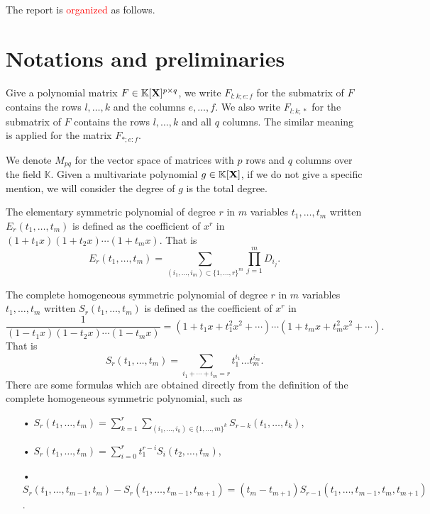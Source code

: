 \documentclass[11pt]{article}
\numberwithin{Property}{section}
\numberwithin{Theorem}{section}
\numberwithin{Proposition}{section}
\numberwithin{Lemma}{section}
\numberwithin{Corollary}{section}
\numberwithin{Definition}{section}
\numberwithin{Remark}{section}
\numberwithin{Conjecture}{section}
\numberwithin{Problem}{section}
\numberwithin{Claim}{section}
\theoremstyle{definition}
\numberwithin{Example}{section}
\newcommand{\field}{\mathbb{K}} %
\newcommand{\mat}[1]{\mathbf{\MakeUppercase{#1}}} %
\newcommand{\todo}[1]{\textcolor{red}{#1}} %
\begin{document}
The report is \todo{organized} as follows.
\section{Notations and preliminaries}
\label{sec:not}
Give a polynomial matrix $F \in \field[\mat{X}]^{p \times q}$, we write $F_{l:k \mathbf{;} e:f}$ for the submatrix of $F$ contains the rows $l, \ldots, k$ and the columns $e, \ldots, f$. We also write $F_{l:k \mathbf{;} *}$ for the submatrix of $F$ contains the rows $l, \ldots, k$ and all $q$ columns. The similar meaning is applied for the matrix $F_{* \mathbf{;} e:f}$. 

We denote $M_{pq}$ for the vector space of matrices with $p$ rows and $q$ columns over the field $\field$. Given a multivariate polynomial $g \in \field[\mat{X}]$, if we do not give a specific mention, we will consider the degree of $g$ is the total degree.  %

The elementary symmetric polynomial of degree $r$ in $m$ variables $t_1, \ldots, t_m$ written $E_{r}(t_1, \ldots, t_m)$ is defined as the coefficient of $x^r$ in $(1+t_1x)(1+t_2x)\cdots(1+t_mx)$. That is
\[E_{r}(t_1, \ldots, t_m) = \sum_{(i_1,\ldots,i_{m}) \subset \{1, \ldots, r\}^{m}}\prod_{j =1}^{m}D_{i_j}.\]

The complete homogeneous symmetric polynomial of degree $r$ in $m$ variables $t_1, \ldots, t_m$ written $S_{r}(t_1, \ldots, t_m)$ is defined as the coefficient of $x^{r}$ in $$\frac{1}{(1-t_1x)(1-t_2x)\cdots(1-t_mx)} = (1+t_1x + t_1^2x^2 + \cdots)\cdots(1+t_mx + t_m^2x^2 + \cdots).$$
That is 
\[
S_r(t_1, \ldots, t_m) = \sum_{i_1 + \cdots + i_m = r} t_1^{i_1}\ldots t_m^{i_m}. 
\]
There are some formulas which are obtained directly from the definition of the complete homogeneous symmetric polynomial, such as 
\begin{itemize}
\item[•] $S_{r}(t_1, \ldots, t_m) =  \sum\limits_{k=1}^r\sum\limits_{(i_1, \ldots, i_k) \in \{1, \ldots, m\}^k}S_{r-k}(t_1, \ldots, t_k)$,
\item[•] $S_{r}(t_1, \ldots, t_{m}) = \sum\limits_{i=0}^{r}t_1^{r-i}S_i(t_2, \ldots, t_m)$,
\item[•] $S_r(t_1, \ldots, t_{m-1}, t_m) - S_r(t_1, \ldots, t_{m-1}, t_{m+1}) = (t_m - t_{m+1})S_{r-1}(t_1, \ldots, t_{m-1}, t_m, t_{m+1})$. 
\end{itemize}
\end{document}
